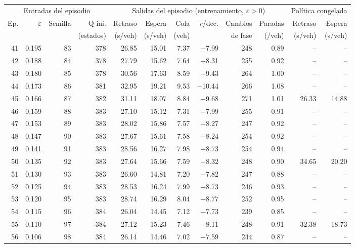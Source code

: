 \begin{table}[H]
\centering
\scriptsize
\setlength{\tabcolsep}{3pt}
\begin{tabular}{rrrrrrrrrrrr}
\toprule
\multicolumn{4}{c}{Entradas del episodio} & \multicolumn{6}{c}{Salidas del episodio (entrenamiento, $\varepsilon>0$)} & \multicolumn{2}{c}{Política congelada} \\
\cmidrule(lr){1-4}\cmidrule(lr){5-10}\cmidrule(lr){11-12}
Ep. & $\varepsilon$ & Semilla & Q ini. & Retraso & Espera & Cola & $r$/dec. & Cambios & Paradas & Retraso & Espera \\
 &  &  & (estados) & (s/veh) & (s/veh) & (veh) &  & de fase & (/veh) & (s/veh) & (s/veh) \\
\midrule
41 & 0.195 & 83 & 378 & 26.85 & 15.01 & 7.37 & $-$7.99 & 248 & 0.89 & -- & -- \\
42 & 0.188 & 84 & 378 & 27.79 & 15.62 & 7.64 & $-$8.31 & 255 & 0.92 & -- & -- \\
43 & 0.180 & 85 & 378 & 30.56 & 17.63 & 8.59 & $-$9.43 & 264 & 1.00 & -- & -- \\
44 & 0.173 & 86 & 381 & 32.95 & 19.21 & 9.53 & $-$10.44 & 266 & 1.08 & -- & -- \\
45 & 0.166 & 87 & 382 & 31.11 & 18.07 & 8.84 & $-$9.68 & 271 & 1.01 & 26.33 & 14.88 \\
46 & 0.159 & 88 & 383 & 27.10 & 15.12 & 7.31 & $-$7.99 & 255 & 0.91 & -- & -- \\
47 & 0.153 & 89 & 383 & 28.02 & 15.86 & 7.57 & $-$8.27 & 247 & 0.92 & -- & -- \\
48 & 0.147 & 90 & 383 & 27.67 & 15.61 & 7.58 & $-$8.24 & 254 & 0.92 & -- & -- \\
49 & 0.141 & 91 & 383 & 28.56 & 16.27 & 7.98 & $-$8.73 & 254 & 0.94 & -- & -- \\
50 & 0.135 & 92 & 383 & 27.64 & 15.66 & 7.59 & $-$8.32 & 248 & 0.90 & 34.65 & 20.20 \\
51 & 0.130 & 93 & 383 & 26.60 & 14.81 & 7.20 & $-$7.82 & 247 & 0.88 & -- & -- \\
52 & 0.125 & 94 & 383 & 28.53 & 16.24 & 7.99 & $-$8.73 & 246 & 0.93 & -- & -- \\
53 & 0.120 & 95 & 383 & 28.74 & 16.29 & 8.04 & $-$8.77 & 252 & 0.95 & -- & -- \\
54 & 0.115 & 96 & 384 & 26.04 & 14.45 & 7.12 & $-$7.73 & 239 & 0.85 & -- & -- \\
55 & 0.110 & 97 & 384 & 27.12 & 15.23 & 7.46 & $-$8.11 & 248 & 0.91 & 32.38 & 18.73 \\
56 & 0.106 & 98 & 384 & 26.14 & 14.46 & 7.02 & $-$7.59 & 244 & 0.87 & -- & -- \\

\end{tabular}
\end{table}
